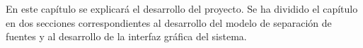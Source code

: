 En este capítulo se explicará el desarrollo del proyecto. Se ha dividido el capítulo en dos secciones correspondientes al desarrollo del modelo de separación de fuentes y al desarrollo de la interfaz gráfica del sistema.